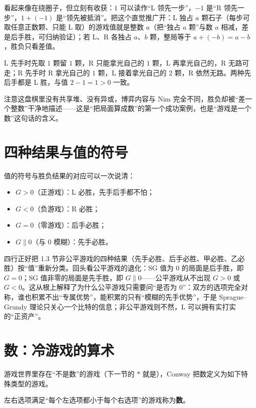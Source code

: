 看起来像在绕圈子，但立刻有收获：$1$ 可以读作“L 领先一步”，$-1$ 是“R 领先一步”，$1+(-1)$ 是“领先被抵消”。把这个直觉推广开：L 独占 $a$ 颗石子（每步可取任意正数颗、只能 L 取）的游戏值就是整数 $a$（把“独占 $a$ 颗”与数 $a$ 相减，差是后手胜，可归纳验证）；若 L、R 各独占 $a$、$b$ 颗，整局等于 $a+(-b)=a-b$，胜负只看差值。

\begin{example}[验证 $a=2,b=1$]
L 先手时先取 $1$ 颗留 $1$ 颗，R 只能拿光自己的 $1$ 颗，L 再拿光自己的，R 无路可走；R 先手时 R 拿光自己的 $1$ 颗，L 接着拿光自己的 $2$ 颗，R 依然无路。两种先后手都是 L 胜，与值 $2-1=1>0$ 一致。
\end{example}

注意这盘棋里没有共享堆、没有异或，博弈内容与 Nim 完全不同，胜负却被“差一个整数”干净地描述——这是“把局面算成数”的第一个成功案例，也是“游戏是一个数”这句话的含义。

\section{四种结果与值的符号}
值的符号与胜负结果的对应可以一次说清：
\begin{itemize}
\item $G>0$（正游戏）：L 必胜，先手后手都不怕；
\item $G<0$（负游戏）：R 必胜；
\item $G=0$（零游戏）：后手必胜；
\item $G\parallel 0$（与 $0$ 模糊）：先手必胜。
\end{itemize}
四行正好把 1.3 节非公平游戏的四种结果（先手必胜、后手必胜、甲必胜、乙必胜）按“值”重新分类。回头看公平游戏的退化：SG 值为 $0$ 的局面是后手胜，即 $G=0$；SG 值非零的局面是先手胜，即 $G\parallel0$——公平游戏从不出现 $G>0$ 或 $G<0$。这从根上解释了为什么公平游戏只需要问“是否为 $0$”：双方的选项完全对称，谁也积累不出“专属优势”，能积累的只有“模糊的先手优势”，于是 Sprague--Grundy 理论只关心一个比特的信息；非公平游戏则不然，L 可以拥有实打实的“正资产”。

\section{数：冷游戏的算术}
游戏世界里存在“不是数”的游戏（下一节的 $\ast$ 就是），Conway 把数定义为如下特殊类型的游戏。

\begin{definition}[数]
左右选项满足“每个左选项都小于每个右选项”的游戏称为\textbf{数}。
\end{definition}

